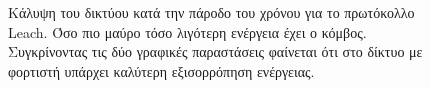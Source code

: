 \begin{figure}[H]
  \centering
  \caption{Κάλυψη του δικτύου κατά την πάροδο του χρόνου για το πρωτόκολλο Leach. Όσο πιο μαύρο τόσο λιγότερη ενέργεια έχει ο κόμβος. Συγκρίνοντας τις δύο γραφικές
παραστάσεις φαίνεται ότι στο δίκτυο με φορτιστή υπάρχει καλύτερη εξισορρόπηση ενέργειας.}
  \label{fig:1exp_4_2}
\end{figure}

